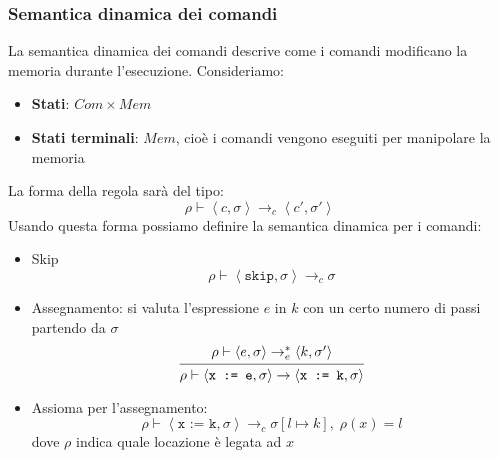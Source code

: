 \documentclass[a4paper]{article}
\begin{document}
\subsubsection{Semantica dinamica dei comandi}
La semantica dinamica dei comandi descrive come i comandi modificano la memoria
durante l'esecuzione. Consideriamo:
\begin{itemize}
  \item \textbf{Stati}: \( Com \times Mem \) 
  \item \textbf{Stati terminali}: \( Mem \), cioè i comandi vengono eseguiti per
    manipolare la memoria
\end{itemize}
La forma della regola sarà del tipo:
\[
  \rho \vdash \left< c, \sigma \right> \to_c \left<c', \sigma' \right>
\] 
Usando questa forma possiamo definire la semantica dinamica per i comandi:
\begin{itemize}
  \item Skip
    \[
      \rho \vdash \left< \texttt{skip}, \sigma \right> \to_c \sigma
    \] 

  \item Assegnamento: si valuta l'espressione \( e \) in \( k \) con un certo numero
    di passi partendo da \( \sigma \) 
    \[
      \begin{prooftree}
        \hypo{ 
          \rho \vdash \left< e, \sigma \right> \to^*_e \left< k, \sigma' \right>
        }
        \infer1{ 
          \rho \vdash \left< \texttt{x := e}, \sigma  \right>
          \to \left< \texttt{x := k}, \sigma \right>
        }
      \end{prooftree}
    \] 

  \item Assioma per l'assegnamento:
    \[
      \rho \vdash \left< \texttt{x := k}, \sigma \right> \to_c
      \sigma[l \mapsto k], \; \rho(x) = l
    \] 
    dove \( \rho \) indica quale locazione è legata ad \( x \)
\end{itemize}
\end{document}
